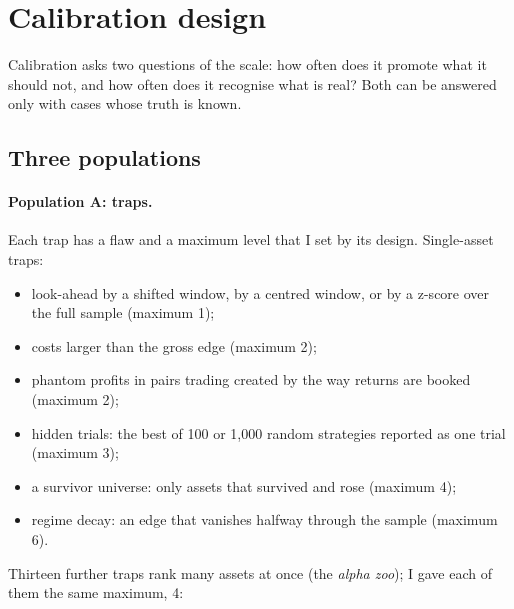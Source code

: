 \documentclass[11pt]{article}
\begin{document}
\section{Calibration design}\label{sec:calib}

Calibration asks two questions of the scale: how often does it promote what it should not, and how often does it
recognise what is real? Both can be answered only with cases whose truth is known.

\subsection{Three populations}

\paragraph{Population A: traps.} Each trap has a flaw and a maximum level that I set by its design. Single-asset traps:
\begin{itemize}
\item look-ahead by a shifted window, by a centred window, or by a z-score over the full sample (maximum 1);
\item costs larger than the gross edge (maximum 2);
\item phantom profits in pairs trading created by the way returns are booked \citep{shcherbyna2026phantom} (maximum 2);
\item hidden trials: the best of 100 or 1,000 random strategies reported as one trial (maximum 3);
\item a survivor universe: only assets that survived and rose (maximum 4);
\item regime decay: an edge that vanishes halfway through the sample (maximum 6).
\end{itemize}
Thirteen further traps rank many assets at once (the \emph{alpha zoo}); I gave each of them the same maximum, 4:
\end{document}
